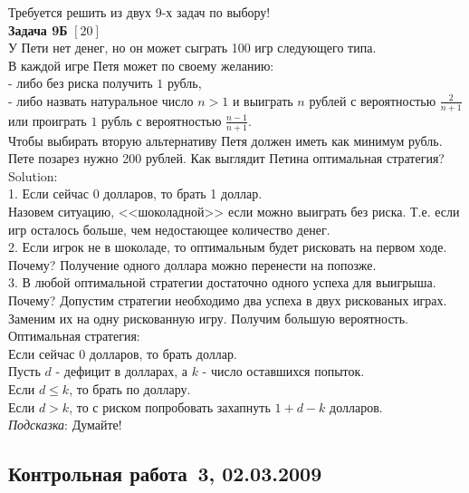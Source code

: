 \documentclass[pdftex,12pt,a4paper]{article}
\begin{document}
Требуется решить \textbf{} из двух 9-х задач по
выбору! \\



\textbf{Задача 9Б} $[20]$ \\
У Пети нет денег, но он может сыграть 100 игр следующего типа. \\
В каждой игре Петя может по своему желанию: \\
- либо без риска получить $1$ рубль, \\
- либо назвать натуральное число $n>1$ и выиграть $n$ рублей с вероятностью $\frac{2}{n+1}$ или проиграть $1$ рубль с вероятностью $\frac{n-1}{n+1}$. \\
Чтобы выбирать вторую альтернативу Петя должен иметь как минимум рубль. Пете позарез нужно 200 рублей. Как выглядит Петина оптимальная стратегия? \\
Solution: \\
1. Если сейчас 0 долларов, то брать 1 доллар. \\
Назовем ситуацию, <<шоколадной>> если можно выиграть без риска. Т.е. если игр осталось больше, чем недостающее количество денег. \\
2. Если игрок не в шоколаде, то оптимальным будет рисковать на первом ходе. \\
Почему? Получение одного доллара можно перенести на попозже. \\
3. В любой оптимальной стратегии достаточно одного успеха для выигрыша. \\
Почему? Допустим стратегии необходимо два успеха в двух рискованых играх. Заменим их  на одну рискованную игру. Получим большую вероятность. \\
Оптимальная стратегия: \\
Если сейчас 0 долларов, то брать доллар. \\
Пусть $d$ - дефицит в долларах, а $k$ - число оставшихся попыток. \\
Если $d\le k$, то брать по доллару. \\
Если $d>k$, то с риском попробовать захапнуть $1+d-k$ долларов. \\




\emph{Подсказка}: Думайте! \\

\subsection{Контрольная работа \No\,3, 02.03.2009}
\end{document}
